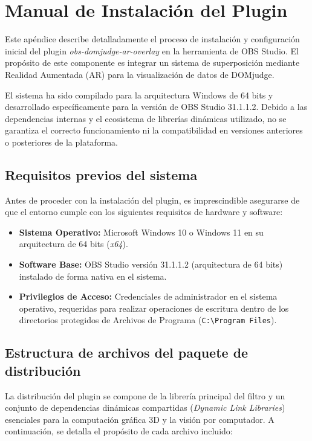 \chapter{Manual de Instalación del Plugin}
\label{Appendix:Instalacion}

Este apéndice describe detalladamente el proceso de instalación y configuración inicial del plugin \textit{obs-domjudge-ar-overlay} en la herramienta  de OBS Studio. El propósito de este componente es integrar un sistema de superposición mediante Realidad Aumentada (AR) para la visualización de datos de DOMjudge. 

El sistema ha sido compilado para la arquitectura Windows de 64 bits y desarrollado específicamente para la versión de OBS Studio 31.1.1.2. Debido a las dependencias internas y el ecosistema de librerías dinámicas utilizado, no se garantiza el correcto funcionamiento ni la compatibilidad en versiones anteriores o posteriores de la plataforma.

\section{Requisitos previos del sistema}

Antes de proceder con la instalación del plugin, es imprescindible asegurarse de que el entorno cumple con los siguientes requisitos de hardware y software:

\begin{itemize}
    \item \textbf{Sistema Operativo:} Microsoft Windows 10 o Windows 11 en su arquitectura de 64 bits (\textit{x64}).
    \item \textbf{Software Base:} OBS Studio versión 31.1.1.2 (arquitectura de 64 bits) instalado de forma nativa en el sistema.
    \item \textbf{Privilegios de Acceso:} Credenciales de administrador en el sistema operativo, requeridas para realizar operaciones de escritura dentro de los directorios protegidos de Archivos de Programa (\texttt{C:\textbackslash Program Files}).
\end{itemize}

\section{Estructura de archivos del paquete de distribución}

La distribución del plugin se compone de la librería principal del filtro y un conjunto de dependencias dinámicas compartidas (\textit{Dynamic Link Libraries}) esenciales para la computación gráfica 3D y la visión por computador. A continuación, se detalla el propósito de cada archivo incluido:

